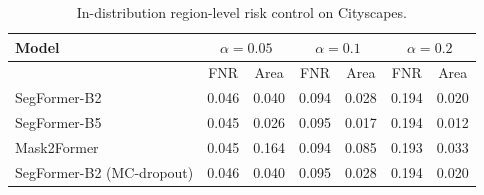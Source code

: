 \begin{table}[t]
\centering
\caption{In-distribution region-level risk control on Cityscapes.}
\label{tab:validity_cityscapes}
\footnotesize
\setlength{\tabcolsep}{3pt}
\begin{tabular}{lcccccc}
\toprule
Model & \multicolumn{2}{c}{$\alpha=0.05$} & \multicolumn{2}{c}{$\alpha=0.1$} & \multicolumn{2}{c}{$\alpha=0.2$} \\
\midrule
 & FNR & Area & FNR & Area & FNR & Area \\
\midrule
SegFormer-B2 & 0.046 & 0.040 & 0.094 & 0.028 & 0.194 & 0.020 \\
SegFormer-B5 & 0.045 & 0.026 & 0.095 & 0.017 & 0.194 & 0.012 \\
Mask2Former & 0.045 & 0.164 & 0.094 & 0.085 & 0.193 & 0.033 \\
SegFormer-B2 (MC-dropout) & 0.046 & 0.040 & 0.095 & 0.028 & 0.194 & 0.020 \\
\bottomrule
\end{tabular}
\end{table}
